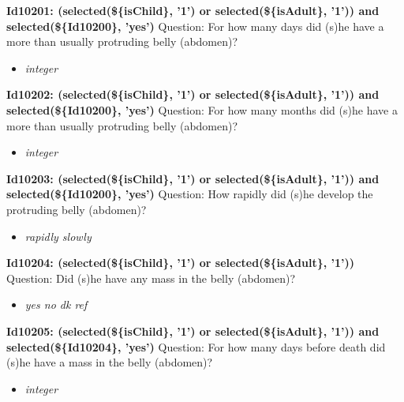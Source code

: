 \documentclass{article}%
\begin{document}
\textbf{Id10201: (selected(\$\{isChild\}, '1') or selected(\$\{isAdult\}, '1')) and selected(\$\{Id10200\}, 'yes')\newline%
}%
Question: For how many days did (s)he have a more than usually protruding belly (abdomen)?\newline%
%
\begin{itemize}%
\item%
\textit{integer\newline%
}%
\end{itemize}%
\textbf{Id10202: (selected(\$\{isChild\}, '1') or selected(\$\{isAdult\}, '1')) and selected(\$\{Id10200\}, 'yes')\newline%
}%
Question: For how many months did (s)he have a more than usually protruding belly (abdomen)?\newline%
%
\begin{itemize}%
\item%
\textit{integer\newline%
}%
\end{itemize}%
\textbf{Id10203: (selected(\$\{isChild\}, '1') or selected(\$\{isAdult\}, '1')) and selected(\$\{Id10200\}, 'yes')\newline%
}%
Question: How rapidly did (s)he develop the protruding belly (abdomen)?\newline%
%
\begin{itemize}%
\item%
\textit{rapidly\newline%
 slowly\newline%
}%
\end{itemize}%
\textbf{Id10204: (selected(\$\{isChild\}, '1') or selected(\$\{isAdult\}, '1'))\newline%
}%
Question: Did (s)he have any mass in the belly (abdomen)?\newline%
%
\begin{itemize}%
\item%
\textit{yes\newline%
 no\newline%
 dk\newline%
 ref\newline%
}%
\end{itemize}%
\textbf{Id10205: (selected(\$\{isChild\}, '1') or selected(\$\{isAdult\}, '1')) and selected(\$\{Id10204\}, 'yes')\newline%
}%
Question: For how many days before death did (s)he have a mass in the belly (abdomen)?\newline%
%
\begin{itemize}%
\item%
\textit{integer\newline%
}%
\end{itemize}%
\end{document}
